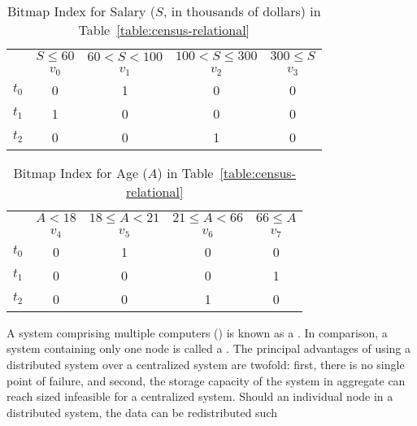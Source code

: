\begin{table}[H]
    \centering
    \caption{Bitmap Index for Salary (\(S\), in thousands of dollars) in Table~\ref{table:census-relational}}
    \label{table:census-salary}
    \begin{tabular}{@{}r||c|c|c|c@{}}
        \toprule
                & \(S \leq 60\) & \(60 < S < 100\) & \(100 < S \leq 300\) & \(300 \leq S\) \\
                & \(v_0\) & \(v_1\) & \(v_2\) & \(v_3\) \\
        \midrule
        \(t_0\) & 0          & 1             & 0          & 0             \\
        \(t_1\) & 1          & 0             & 0          & 0             \\
        \(t_2\) & 0          & 0             & 1          & 0             \\
        \bottomrule
    \end{tabular}
\end{table}
%
\begin{table}[H]
    \centering
    \caption{Bitmap Index for Age (\(A\)) in Table~\ref{table:census-relational}}
    \label{table:census-age}
    \begin{tabular}{@{}r||c|c|c|c@{}}
        \toprule
                & \(A < 18\) & \(18 \leq  A < 21\) & \(21 \leq A < 66\) & \(66 \leq A\) \\
                & \(v_4\) & \(v_5\) & \(v_6\) & \(v_7\) \\
        \midrule
        \(t_0\) & 0          & 1             & 0          & 0             \\
        \(t_1\) & 0          & 0             & 0          & 1             \\
        \(t_2\) & 0          & 0             & 1          & 0             \\
        \bottomrule
    \end{tabular}
\end{table}
\par
A system comprising multiple computers () is known as a
. In comparison, a system containing only one node is
called a . The principal advantages of using a
distributed system over a centralized system are twofold: first, there is no
single point of failure, and second, the storage capacity of the system in
aggregate can reach sized infeasible for a centralized system. Should an
individual node in a distributed system, the data can be redistributed such
